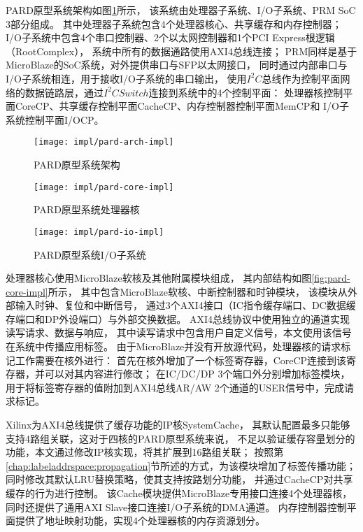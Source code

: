 PARD原型系统架构如图\ref{fig:pard-arch-impl}所示，
该系统由处理器子系统、I/O子系统、PRM SoC 3部分组成。
其中处理器子系统包含4个处理器核心、共享缓存和内存控制器；
I/O子系统中包含4个串口控制器、2个以太网控制器和1个PCI Express根逻辑（RootComplex），
系统中所有的数据通路使用AXI4总线连接；
PRM同样是基于MicroBlaze的SoC系统，对外提供串口与SFP以太网接口，
同时通过内部串口与I/O子系统相连，用于接收I/O子系统的串口输出，
使用$I^2C$总线作为控制平面网络的数据链路层，通过$I^2C Switch$连接到系统中的4个控制平面：
处理器核控制平面CoreCP、共享缓存控制平面CacheCP、内存控制器控制平面MemCP和
I/O子系统控制平面I/OCP。

\begin{figure}[tb]
  \centering
  \texttt{[image: impl/pard-arch-impl]}
  \caption{PARD原型系统架构}
  \label{fig:pard-arch-impl}
\end{figure}

\begin{figure}[tb]
\begin{minipage}{0.48\textwidth}
  \centering
  \texttt{[image: impl/pard-core-impl]}
  \caption{PARD原型系统处理器核}
  \label{fig:pard-core-impl}
\end{minipage}\hfill
\begin{minipage}{0.48\textwidth}
  \centering
  \texttt{[image: impl/pard-io-impl]}
  \caption{PARD原型系统I/O子系统}
  \label{fig:pard-io-impl}
\end{minipage}
\end{figure}

处理器核心使用MicroBlaze软核及其他附属模块组成，
其内部结构如图\ref{fig:pard-core-impl}所示，
其中包含MicroBlaze软核、中断控制器和时钟模块，
该模块从外部输入时钟、复位和中断信号，
通过3个AXI4接口（IC指令缓存端口、DC数据缓存端口和DP外设端口）与外部交换数据。
AXI4总线协议中使用独立的通道实现读写请求、数据与响应，
其中读写请求中包含用户自定义信号，本文使用该信号在系统中传播应用标签。
由于MicroBlaze并没有开放源代码，处理器核的请求标记工作需要在核外进行：
首先在核外增加了一个标签寄存器，CoreCP连接到该寄存器，并可以对其内容进行修改；
在IC/DC/DP 3个端口外分别增加标签模块，
用于将标签寄存器的值附加到AXI4总线AR/AW 2个通道的USER信号中，完成请求标记。

Xilinx为AXI4总线提供了缓存功能的IP核SystemCache\cite{pg118-system-cache}，
其默认配置最多只能够支持4路组关联，这对于四核的PARD原型系统来说，
不足以验证缓存容量划分的功能，本文通过修改IP核实现，将其扩展到16路组关联；
按照第\ref{chap:labeladdrspace:propagation}节所述的方式，为该模块增加了标签传播功能；
同时修改其默认LRU替换策略，使其支持按路划分功能，
并通过CacheCP对共享缓存的行为进行控制。%
该Cache模块提供MicroBlaze专用接口连接4个处理器核，
同时还提供了通用AXI Slave接口连接I/O子系统的DMA通道。
内存控制器控制平面提供了地址映射功能，实现4个处理器核的内存资源划分。

